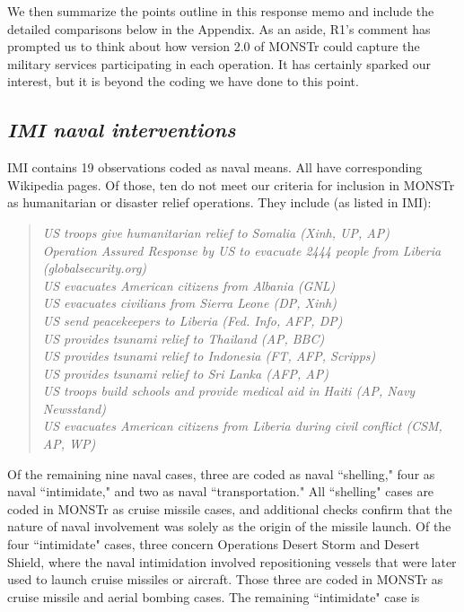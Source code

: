 \documentclass[fleqn,12pt]{article}
\begin{document}
\noindent
We then summarize the points outline in this response memo and include the detailed comparisons below in the Appendix. As an aside, R1's comment has prompted us to think about how version 2.0 of MONSTr could capture the military services participating in each operation. It has certainly sparked our interest, but it is beyond the coding we have done to this point.

\subsection*{\textit{IMI naval interventions}}
IMI contains 19 observations coded as naval means. All have corresponding Wikipedia pages. Of those, ten do not meet our criteria for inclusion in MONSTr as humanitarian or disaster relief operations. They include (as listed in IMI): 

\begin{quote}
    \textit{US troops give humanitarian relief to Somalia (Xinh, UP, AP) \\
    Operation Assured Response by US to evacuate 2444 people from Liberia (globalsecurity.org) \\
    US evacuates American citizens from Albania (GNL) \\
    US evacuates civilians from Sierra Leone (DP, Xinh) \\
    US send peacekeepers to Liberia (Fed. Info, AFP, DP) \\
    US provides tsunami relief to Thailand (AP, BBC) \\
    US provides tsunami relief to Indonesia (FT, AFP, Scripps) \\
    US provides tsunami relief to Sri Lanka (AFP, AP) \\
    US troops build schools and provide medical aid in Haiti (AP, Navy Newsstand) \\
    US evacuates American citizens from Liberia during civil conflict (CSM, AP, WP)}
\end{quote}

Of the remaining nine naval cases, three are coded as naval ``shelling," four as naval ``intimidate," and two as naval ``transportation." All ``shelling" cases are coded in MONSTr as cruise missile cases, and additional checks confirm that the nature of naval involvement was solely as the origin of the missile launch. Of the four ``intimidate" cases, three concern Operations Desert Storm and Desert Shield, where the naval intimidation involved repositioning vessels that were later used to launch cruise missiles or aircraft. Those three are coded in MONSTr as cruise missile and aerial bombing cases. The remaining ``intimidate" case is 
\end{document}
